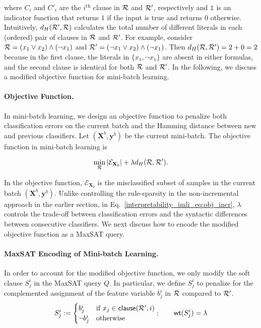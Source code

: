  where $ C_i $ and $ C'_i $ are the $ i^\text{th} $ clause in $ {\mathcal{R}} $ and $ {\mathcal{R}}' $, respectively and $ \mathds{1} $ is an indicator function that returns $ 1 $ if the input is true and returns $ 0 $ otherwise.  Intuitively, $ d_{H}({\mathcal{R}}', {\mathcal{R}}) $ calculates the total number of different literals in each (ordered) pair of clauses in $ {\mathcal{R}} $  and $ {\mathcal{R}}' $.  For example, consider $ {\mathcal{R}} = (x_1 \vee x_2) \wedge (\neg x_1) $ and $ {\mathcal{R}}' = (\neg x_1 \vee x_2) \wedge (\neg x_1) $. Then $ 	d_{H}({\mathcal{R}}, {\mathcal{R}}') = 2 + 0 = 2 $ because in the first clause, the  literals in $ \{x_1, \neg x_1\} $ are absent in either formulas, and the second clause is identical for both $ {\mathcal{R}} $ and $ {\mathcal{R}}' $. In the following, we discuss a modified objective function for mini-batch learning.



\paragraph{Objective Function.}
\label{interpretability_imli_sec:obj_incremental}
In mini-batch learning, we design an objective function to penalize both classification errors on the current batch and the Hamming distance between new and previous classifiers. Let $ (\mathbf{X}^b, \mathbf{y}^b) $ be the current mini-batch. The objective function in mini-batch learning is




\begin{align}
\label{interpretability_imli_eq:obj_incr}
\min_{{\mathcal{R}}} |\mathcal{E}_{\mathbf{X}_b}|+\lambda d_{H}({\mathcal{R}}, {\mathcal{R}}').
\end{align}

In the objective function, $ \mathcal{E}_{\mathbf{X}_b} $ is the misclassified subset of samples in the current batch $ (\mathbf{X}^b, \mathbf{y}^b) $. Unlike controlling the rule-sparsity in the non-incremental approach in the earlier section, in Eq.~\eqref{interpretability_imli_eq:obj_incr}, $ \lambda $ controls the trade-off between classification errors and the syntactic differences between consecutive classifiers. We next discuss how to encode the modified objective function as a MaxSAT query. 
 

\paragraph{MaxSAT Encoding of Mini-batch Learning.}
\label{interpretability_imli_sec:encoding_incremental}
In order to account for the modified objective function, we only modify the soft clause $ S_j^i $ in the MaxSAT query $ Q $. In particular, we define $ S_j^i $ to penalize for the complemented assignment  of the feature variable $ b_j^i $ in $ {\mathcal{R}} $ compared to $ {\mathcal{R}}' $.
\[
S_j^i:=
\begin{cases}
b_j^i& \text{if }  x_j \in  \mathsf{clause}({\mathcal{R}}',i)  \\
\neg b_j^i & \text{otherwise}
\end{cases};\qquad \mathsf{wt}(S_j^i)=\lambda
\]

